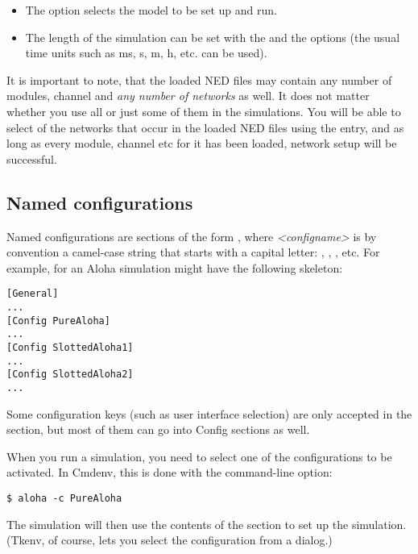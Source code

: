 \begin{itemize}
  \item{The  option selects the model to be set up and run.}
  \item{The length of the simulation can be set with the
     and the  options (the
    usual time units such as ms, s, m, h, etc. can be used).}
\end{itemize}

It is important to note, that the loaded NED files may contain
any number of modules, channel and \textit{any number of networks} as well.
It does not matter whether you use all or just some of them
in the simulations. You will be able to select  of the
networks that occur in the loaded NED files using the 
 entry, and as long as every module, channel etc
for it has been loaded, network setup will be successful.


\subsection{Named configurations}

Named configurations are sections of the form , where
\textit{<configname>} is by convention a camel-case string that starts with a capital letter:
, , , etc. For example,
 for an Aloha simulation might have the following skeleton:

\begin{Verbatim}[commandchars=\\\{\}]
[General]
...
[Config PureAloha]
...
[Config SlottedAloha1]
...
[Config SlottedAloha2]
...
\end{Verbatim}

Some configuration keys (such as user interface selection) are only
accepted in the \ttt{[General]} section, but most of them can go into Config
sections as well.

When you run a simulation, you need to select one of the configurations
to be activated. In Cmdenv, this is done with the  command-line option:

\begin{Verbatim}[commandchars=\\\{\}]
$ aloha -c PureAloha
\end{Verbatim}

The simulation will then use the contents of the 
section to set up the simulation. (Tkenv, of course, lets you select
the configuration from a dialog.)


